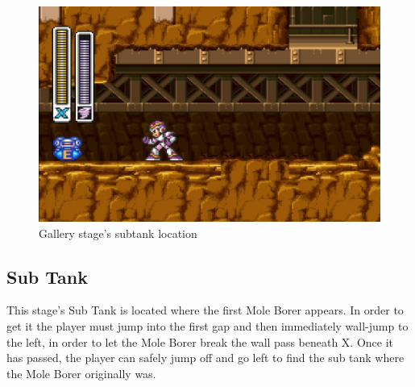 \begin{figure}[htp]
	\centering
	\includegraphics[width=0.5\linewidth]{figures/X1/Armored_armadillo/Armadillo_tank.jpg}
	\caption{Gallery stage's subtank location}
\end{figure}

\subsection{Sub Tank}
This stage's Sub Tank is located where the first Mole Borer appears. In order to get it the player must jump into the first gap and then immediately wall-jump to the left, in order to let the Mole Borer break the wall pass beneath X. Once it has passed, the player can safely jump off and go left to find the sub tank where the Mole Borer originally was. 

